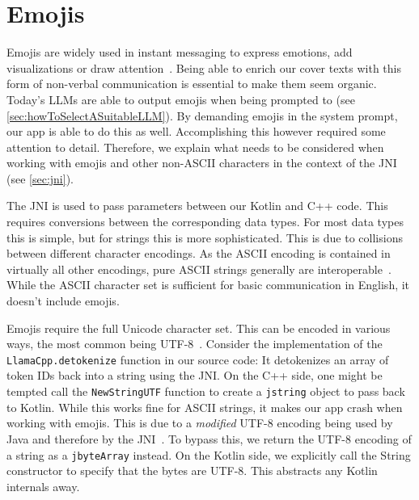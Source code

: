 \section{Emojis}
\label{sec:emojis}
Emojis are widely used in instant messaging to express emotions, add visualizations or draw attention~\cite{zhouGoodbyeTextHello2017}. Being able to enrich our cover texts with this form of non-verbal communication is essential to make them seem organic. Today's \glspl{LLM} are able to output emojis when being prompted to (see \cref{sec:howToSelectASuitableLLM}). By demanding emojis in the system prompt, our app is able to do this as well. Accomplishing this however required some attention to detail. Therefore, we explain what needs to be considered when working with emojis and other non-ASCII characters in the context of the \gls{JNI} (see \cref{sec:jni}).

The \gls{JNI} is used to pass parameters between our Kotlin and C++ code. This requires conversions between the corresponding data types. For most data types this is simple, but for strings this is more sophisticated. This is due to collisions between different character encodings. As the ASCII encoding is contained in virtually all other encodings, pure ASCII strings generally are interoperable~\cite{gleaveMakingCompressionAlgorithms2017}. While the ASCII character set is sufficient for basic communication in English, it doesn't include emojis.

Emojis require the full Unicode character set. This can be encoded in various ways, the most common being UTF-8~\cite{gleaveMakingCompressionAlgorithms2017}. Consider the implementation of the \lstinline|LlamaCpp.detokenize| function in our source code: It detokenizes an array of token IDs back into a string using the \gls{JNI}. On the C++ side, one might be tempted call the \lstinline|NewStringUTF| function to create a \lstinline|jstring| object to pass back to Kotlin. While this works fine for ASCII strings, it makes our app crash when working with emojis. This is due to a \textit{modified} UTF-8 encoding being used by Java and therefore by the \gls{JNI}~\cite{oracleJNIFunctions}. To bypass this, we return the UTF-8 encoding of a string as a \lstinline|jbyteArray| instead. On the Kotlin side, we explicitly call the String constructor to specify that the bytes are UTF-8. This abstracts any Kotlin internals away.

